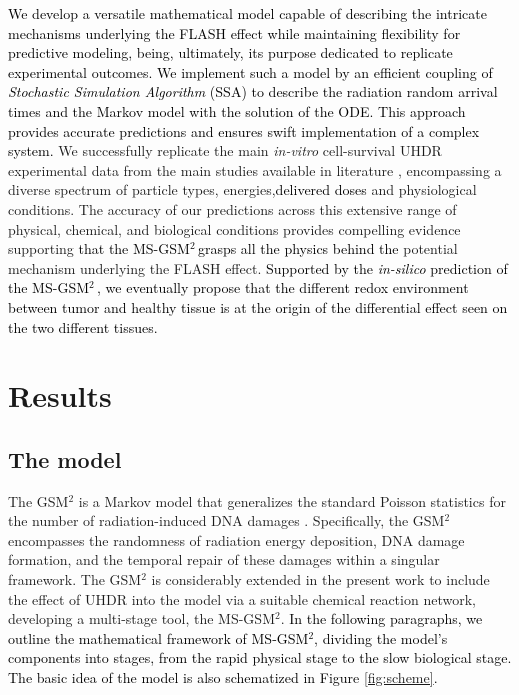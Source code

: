 \documentclass[10pt]{iopart}
\newcommand{\gsm}{MS-GSM$^2\,$}
\newcommand{\marco}[1]{\textcolor{black}{#1}}
\newcommand{\fra}[1]{\textcolor{black}{#1}}
\newcommand{\ema}[1]{\textcolor{black}{#1}}
\numberwithin{table}{section}
\begin{document}
\marco{We develop a versatile mathematical model capable of describing the intricate mechanisms underlying the FLASH effect while maintaining flexibility for predictive modeling, being, ultimately, its purpose \ema{dedicated to} replicate experimental outcomes.} \fra{We implement such a model by an efficient coupling of \textit{Stochastic Simulation Algorithm} (SSA) to describe the radiation random arrival times and the Markov model with the solution of the ODE. This approach provides accurate predictions and ensures swift implementation of a complex system.} We successfully replicate the main \textit{in-vitro} cell-survival UHDR experimental data from the main studies available in literature \cite{Adrian2020, Tessonnier2021, Tinganelliinvitro2022}, encompassing a diverse spectrum of particle types, energies,\ema{delivered doses} and physiological conditions. The accuracy of our predictions across this extensive range of physical, chemical, and biological conditions provides compelling evidence supporting \ema{that the \gsm grasps all the physics behind the } potential mechanism underlying the FLASH effect. \fra{Supported by the \textit{in-silico} prediction of the \gsm, we eventually propose that the different redox environment between tumor and healthy tissue is at the origin of the differential effect seen on the two different tissues.}

\section*{Results}

\subsection*{The model}\label{SEC:Model}

The GSM$^2$ \cite{cordoni2021generalized, cordoni2022cell} is a Markov model that generalizes the standard Poisson statistics for the number of radiation-induced DNA damages \cite{cordoni2022multiple, cordoni2023emergence}. Specifically, the GSM$^2$ encompasses the randomness of radiation energy deposition, DNA damage formation, and the temporal repair of these damages within a singular framework. The GSM$^2$ is considerably extended in the present work to include the effect of UHDR into the model via a suitable chemical reaction network, developing a multi-stage tool, the MS-GSM$^2$. \fra{In the following paragraphs, we outline the mathematical framework of MS-GSM$^2$, dividing the model's components into stages, from the rapid physical stage to the slow biological stage.} \marco{The basic idea of the model is also schematized in Figure \ref{fig:scheme}.}
\end{document}
